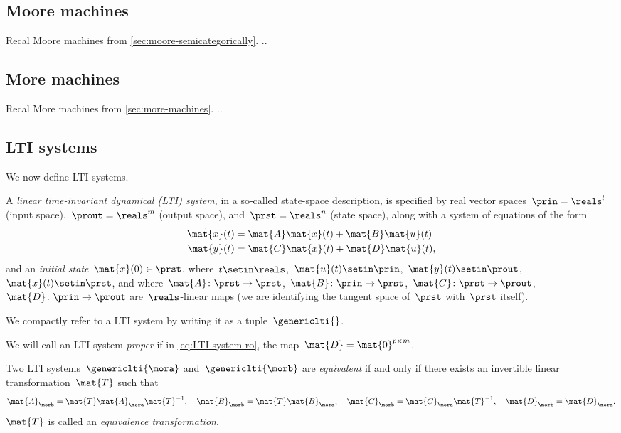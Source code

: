 \subsection{Moore machines}

Recal Moore machines from \cref{sec:moore-semicategorically}.
..

\subsection{More machines}

Recal More machines from \cref{sec:more-machines}.
..

\subsection{LTI systems}

We now define LTI systems.

\begin{definition}
    \label{def:LTI_syst}
    A \emph{linear time-invariant dynamical (LTI) system}, in a so-called state-space description, is specified by real vector spaces~$\prin=\reals^l$ (input space),~$\prout=\reals^m$ (output space), and~$\prst=\reals^n$ (state space), along with a system of equations of the form
    \begin{align}
        \dot{\mat{x}}(t) & = \mat{A}\mat{x}(t) + \mat{B}\mat{u}(t) \label{eq:LTI-system-dyn} \\
        \mat{y}(t)       & = \mat{C}\mat{x}(t) + \mat{D}\mat{u}(t) \label{eq:LTI-system-ro},
    \end{align}
    and an \emph{initial state}~$\mat{x}(0)\in \prst$, where~$t \setin \reals$,~$\mat{u}(t) \setin \prin$,~$\mat{y}(t) \setin \prout$,~$\mat{x}(t) \setin \prst$, and where~$\mat{A}\colon \prst \to \prst$,~$\mat{B}\colon \prin \to \prst$,~$\mat{C}\colon \prst \to \prout$,~$\mat{D}\colon \prin \to \prout$ are~$\reals$-linear maps (we are identifying the tangent space of~$\prst$ with~$\prst$ itself).
\end{definition}

We compactly refer to a LTI system by writing it as a tuple~$\genericlti{}$.

We will call an LTI system \emph{proper} if in \cref{eq:LTI-system-ro}, the map~$\mat{D}=\mat{0}^{p \times m}$.

\begin{definition}
    \label{def:equivalence_lti}
    Two LTI systems~$\genericlti{\mora}$ and~$\genericlti{\morb}$ are \emph{equivalent} if and only if there exists an invertible linear transformation~$\mat{T}$ such that
    \begin{equation*}
        \mat{A}_\morb = \mat{T}\mat{A}_\mora \mat{T}^{-1}, \quad \mat{B}_\morb = \mat{T}\mat{B}_\mora, \quad \mat{C}_\morb =\mat{C}_\mora\mat{T}^{-1},\quad \mat{D}_\morb=\mat{D}_\mora.
    \end{equation*}
    $\mat{T}$ is called an \emph{equivalence transformation}.
\end{definition}


